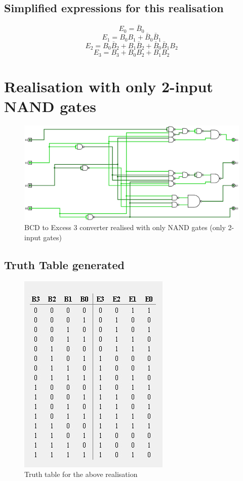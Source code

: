 \documentclass[12pt]{article}
\begin{document}
\subsection{Simplified expressions for this realisation}
$$E_0=\bar{B}_0$$
$$E_1=B_0B_1+\bar{B}_0\bar{B}_1 $$
$$E_2=B_0\bar{B}_2+B_1\bar{B}_2+\bar{B}_0\bar{B}_1B_2$$
$$E_3=B_3+B_0B_2+B_1B_2$$
\newpage
\section{Realisation with only 2-input NAND gates}
\begin{center}
    \begin{figure}[ht]
        \includegraphics[scale=0.30]{only2nands.png}
        \caption{BCD to Excess 3 converter realised with only NAND gates (only 2-input gates)}
    \end{figure}
\end{center}
\newpage
\subsection{Truth Table generated}
\begin{center}
    \begin{figure}[ht]
        \includegraphics{ttonly2nands.jpg}
        \caption{Truth table for the above realisation}
    \end{figure}
\end{center}
\newpage
\end{document}
